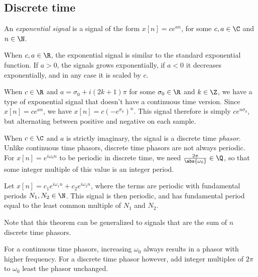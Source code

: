 \documentclass[12pt]{article}
\begin{document}
\subsection{Discrete time}

\begin{defn}
    An \emph{exponential signal} is a signal of the form $x[n] = ce^{an}$, for some $c, a \in \C$ and $n \in \N$.
\end{defn}

When $c, a \in \R$, the exponential signal is similar to the standard exponential function. If $a > 0$, the signals grows exponentially, if $a < 0$ it decreases exponentially, and in any case it is scaled by $c$.

When $c \in \R$ and $a = \sigma_0 + i(2k+1)\pi$ for some $\sigma_0 \in \R$ and $k \in \Z$, we have a type of exponential signal that doesn't have a continuous time version. Since $x[n] = ce^{an}$, we have $x[n] = c\left(-e^{\sigma_0}\right)^n$. This signal therefore is simply $ce^{n\sigma_0}$, but alternating between positive and negative on each sample.

When $c \in \C$ and $a$ is strictly imaginary, the signal is a discrete time \emph{phasor}. Unlike continuous time phasors, discrete time phasors are not always periodic. For $x[n] = e^{i\omega_0n}$ to be periodic in discrete time, we need $\frac{2\pi}{\abs{\omega_0}} \in \Q$, so that some integer multiple of this value is an integer period.

\begin{thm}
    Let $x[n] = c_1e^{i\omega_1n} + c_2e^{i\omega_2n}$, where the terms are periodic with fundamental periods $N_1, N_2 \in \N$. This signal is then periodic, and has fundamental period equal to the least common multiple of $N_1$ and $N_2$.
\end{thm}

\begin{rmk}
    Note that this theorem can be generalized to signals that are the sum of $n$ discrete time phasors.
\end{rmk}

\begin{rmk}
    For a continuous time phasors, increasing $\omega_0$ always results in a phasor with higher frequency. For a discrete time phasor however, add integer multiples of $2\pi$ to $\omega_0$ least the phasor unchanged.
\end{rmk}
\end{document}
